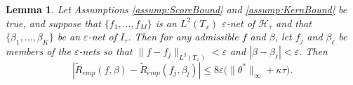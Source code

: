 \documentclass[twoside, onecolumn]{article}
\def\Hcal{\mathcal{H}}
\def\Hcal{\mathcal{H}}
\newtheorem{lemma}{Lemma}
\begin{document}
\begin{lemma}\label{lem:ClosenessOfEmpRisk}
Let Assumptions \ref{assump:ScoreBound} and \ref{assump:KernBound} be true, and suppose that $\{f_1, \dots, f_{M}\}$ is an $L^2 (T_{x})$ $\varepsilon$-net of $\mathcal{H}_\tau$ and that $\{\beta_1, \dots, \beta_K\}$ be an $\varepsilon$-net of $I_\tau$. 
Then for any admissible $f$  and $\beta$, let $f_j$ and $\beta_\ell$ be members of the $\varepsilon$-nets so that $\|f-f_j\|_{L^2(T_x)}<\varepsilon$ and 
$|\beta-\beta_\ell|<\varepsilon$. Then
\begin{equation}\label{eq:DiffLoss}
\left|\widetilde R_{emp}(f, \beta) - \widetilde R_{emp}(f_j, \beta_l)\right| \leq 8\varepsilon \Big(\|\theta^\ast\|_\infty +\kappa\tau \Big).
\end{equation}
\end{lemma}
\end{document}

